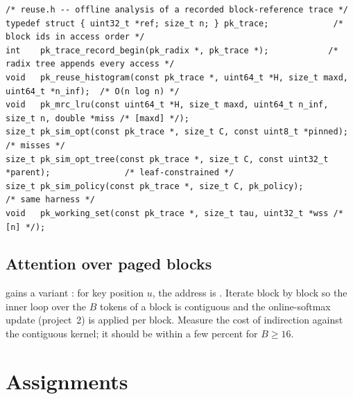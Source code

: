 \begin{lstlisting}[style=c]
/* reuse.h -- offline analysis of a recorded block-reference trace */
typedef struct { uint32_t *ref; size_t n; } pk_trace;             /* block ids in access order */
int    pk_trace_record_begin(pk_radix *, pk_trace *);            /* radix tree appends every access */
void   pk_reuse_histogram(const pk_trace *, uint64_t *H, size_t maxd, uint64_t *n_inf);  /* O(n log n) */
void   pk_mrc_lru(const uint64_t *H, size_t maxd, uint64_t n_inf, size_t n, double *miss /* [maxd] */);
size_t pk_sim_opt(const pk_trace *, size_t C, const uint8_t *pinned);                      /* misses */
size_t pk_sim_opt_tree(const pk_trace *, size_t C, const uint32_t *parent);               /* leaf-constrained */
size_t pk_sim_policy(const pk_trace *, size_t C, pk_policy);                              /* same harness */
void   pk_working_set(const pk_trace *, size_t tau, uint32_t *wss /* [n] */);
\end{lstlisting}

\subsection{Attention over paged blocks}

 gains a variant : for key position $u$, the address is . Iterate block by block so the inner loop over the $B$ tokens of a block is contiguous and the online-softmax update (project~2) is applied per block. Measure the cost of indirection against the contiguous kernel; it should be within a few percent for $B\ge 16$.

\section{Assignments}

